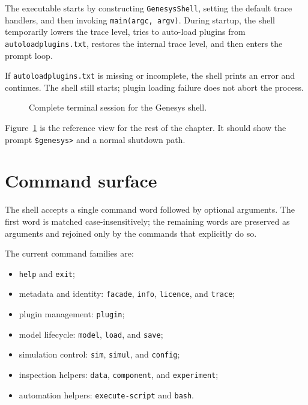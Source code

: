 The executable starts by constructing \texttt{GenesysShell}, setting the
default trace handlers, and then invoking \texttt{main(argc, argv)}. During
startup, the shell temporarily lowers the trace level, tries to auto-load
plugins from \texttt{autoloadplugins.txt}, restores the internal trace level,
and then enters the prompt loop.

If \texttt{autoloadplugins.txt} is missing or incomplete, the shell prints an
error and continues. The shell still starts; plugin loading failure does not
abort the process.

\begin{figure}[htbp]
\centering
\caption{Complete terminal session for the Genesys shell.}
\label{fig:shell-session}
\end{figure}

Figure~\ref{fig:shell-session} is the reference view for the rest of the
chapter. It should show the prompt \texttt{\$genesys>} and a normal shutdown
path.

\section{Command surface}
\label{sec:shell-command-surface}

The shell accepts a single command word followed by optional arguments. The
first word is matched case-insensitively; the remaining words are preserved as
arguments and rejoined only by the commands that explicitly do so.

The current command families are:
\begin{itemize}
\item \texttt{help} and \texttt{exit};
\item metadata and identity: \texttt{facade}, \texttt{info}, \texttt{licence},
and \texttt{trace};
\item plugin management: \texttt{plugin};
\item model lifecycle: \texttt{model}, \texttt{load}, and \texttt{save};
\item simulation control: \texttt{sim}, \texttt{simul}, and \texttt{config};
\item inspection helpers: \texttt{data}, \texttt{component}, and
\texttt{experiment};
\item automation helpers: \texttt{execute-script} and \texttt{bash}.
\end{itemize}

